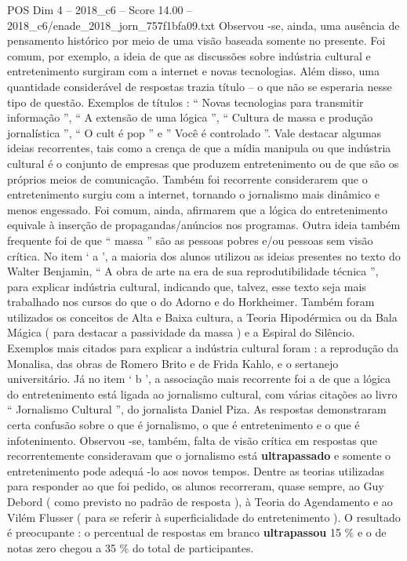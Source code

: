 \begin{textsample}{POS Dim 4 – 2018\_c6 – Score 14.00 – 2018\_c6/enade\_2018\_jorn\_757f1bfa09.txt}
Observou -se, ainda, uma ausência de pensamento histórico por meio de uma visão baseada somente no presente.
Foi comum, por exemplo, a ideia de que as discussões sobre indústria cultural e entretenimento surgiram com a internet e novas tecnologias.
Além disso, uma quantidade considerável de respostas trazia título – o que não se esperaria nesse tipo de questão.
Exemplos de títulos : “ Novas tecnologias para transmitir informação ”, “ A extensão de uma lógica ”, “ Cultura de massa e produção jornalística ”, “ O cult é pop ” e ” Você é controlado ”.
Vale destacar algumas ideias recorrentes, tais como a crença de que a mídia manipula ou que indústria cultural é o conjunto de empresas que produzem entretenimento ou de que são os próprios meios de comunicação.
Também foi recorrente considerarem que o entretenimento surgiu com a internet, tornando o jornalismo mais dinâmico e menos engessado.
Foi comum, ainda, afirmarem que a lógica do entretenimento equivale à inserção de propagandas/anúncios nos programas.
Outra ideia também frequente foi de que “ massa ” são as pessoas pobres e/ou pessoas sem visão crítica.
No item ‘ a ’, a maioria dos alunos utilizou as ideias presentes no texto do Walter Benjamin, “ A obra de arte na era de sua reprodutibilidade técnica ”, para explicar indústria cultural, indicando que, talvez, esse texto seja mais trabalhado nos cursos do que o do Adorno e do Horkheimer.
Também foram utilizados os conceitos de Alta e Baixa cultura, a Teoria Hipodérmica ou da Bala Mágica ( para destacar a passividade da massa ) e a Espiral do Silêncio.
Exemplos mais citados para explicar a indústria cultural foram : a reprodução da Monalisa, das obras de Romero Brito e de Frida Kahlo, e o sertanejo universitário.
Já no item ‘ b ’, a associação mais recorrente foi a de que a lógica do entretenimento está ligada ao jornalismo cultural, com várias citações ao livro “ Jornalismo Cultural ”, do jornalista Daniel Piza.
As respostas demonstraram certa confusão sobre o que é jornalismo, o que é entretenimento e o que é infotenimento.
Observou -se, também, falta de visão crítica em respostas que recorrentemente consideravam que o jornalismo está \textbf{ultrapassado} e somente o entretenimento pode adequá -lo aos novos tempos.
Dentre as teorias utilizadas para responder ao que foi pedido, os alunos recorreram, quase sempre, ao Guy Debord ( como previsto no padrão de resposta ), à Teoria do Agendamento e ao Vilém Flusser ( para se referir à superficialidade do entretenimento ).
O resultado é preocupante : o percentual de respostas em branco \textbf{ultrapassou} 15 \% e o de notas zero chegou a 35 \% do total de participantes.

\end{textsample}
